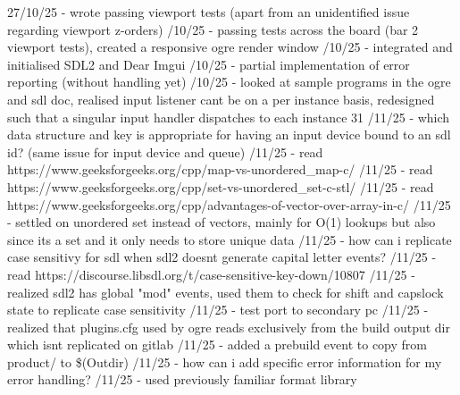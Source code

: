 \documentclass[]{final_report}
\begin{document}
27/10/25 - wrote passing viewport tests (apart from an unidentified issue regarding viewport z-orders) /10/25 - passing tests across the board (bar 2 viewport tests), created a responsive ogre render window /10/25 - integrated and initialised SDL2 and Dear Imgui /10/25 - partial implementation of error reporting (without handling yet) /10/25 - looked at sample programs in the ogre and sdl doc, realised input listener cant be on a per instance basis, redesigned such that a singular input handler dispatches to each instance
31 /11/25 - which data structure and key is appropriate for having an input device bound to an sdl id? (same issue for input device and queue) /11/25 - read https://www.geeksforgeeks.org/cpp/map-vs-unordered\_map-c/ /11/25 - read https://www.geeksforgeeks.org/cpp/set-vs-unordered\_set-c-stl/ /11/25 - read https://www.geeksforgeeks.org/cpp/advantages-of-vector-over-array-in-c/ /11/25 - settled on unordered set instead of vectors, mainly for O(1) lookups but also since its a set and it only needs to store unique data /11/25 - how can i replicate case sensitivy for sdl when sdl2 doesnt generate capital letter events?  /11/25 - read https://discourse.libsdl.org/t/case-sensitive-key-down/10807 /11/25 - realized sdl2 has global "mod" events, used them to check for shift and capslock state to replicate case sensitivity /11/25 - test port to secondary pc /11/25 - realized that plugins.cfg used by ogre reads exclusively from the build output dir which isnt replicated on gitlab /11/25 - added a prebuild event to copy from product/ to \$(Outdir) /11/25 - how can i add specific error information for my error handling? /11/25 - used previously familiar format library \newline
\end{document}
